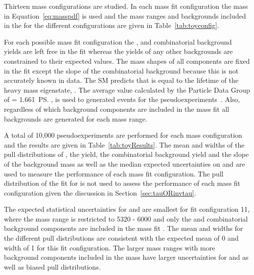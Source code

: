 
Thirteen mass configurations are studied. In each mass fit configuration the mass \pdf in Equation~\ref{eq:masspdf} is used and the mass ranges and backgrounds included in the \pdf for the different configurations are given in Table~\ref{tab:toyconfig}.


For each possible mass fit configuration the \bsmumu, \bdmumu and combinatorial background yields are left free in the fit whereas the yields of any other backgrounds are constrained to their expected values. The mass shapes of all components are fixed in the \ml fit except the slope of the combinatorial background because this is not accurately known in data. 
The SM predicts that \tmumu is equal to the lifetime of the heavy \bs mass eigenstate, \tH. The average value calculated by the Particle Data Group of \tmumu = 1.661~\ps, is used to generated events for the pseudoexperiments~\cite{Olive:2016xmw}. %
Also, regardless of which background components are included in the mass fit all backgrounds are generated for each mass range. %

A total of 10,000 pseudoexperiments are performed for each mass configuration and the results are given in Table~\ref{tab:toyResults}. The mean and widths of the pull distributions of \Gmumu, the \bsmumu yield, the combinatorial background yield and the slope of the background mass \pdf as well as the median expected uncertainties on \tmumu and \Gmumu are used to measure the performance of each mass fit configuration. The pull distribution of the fit for \tmumu is not used to assess the performance of each mass fit configuration given the discussion in Section~\ref{sec:tauORinvtau}.



The expected statistical uncertainties for \tmumu and \Gmumu are smallest for fit configuration 11, where the mass range is restricted to 5320 - 6000 \mevcc and only the \bsmumu and combinatorial background components are included in the mass fit \pdf. The mean and widths for the different pull distributions are consistent with the expected mean of 0 and width of 1 for this fit configuration. The larger mass ranges with more background components included in the mass \pdf have larger uncertainties for \tmumu and \Gmumu as well as biased pull distributions. %

